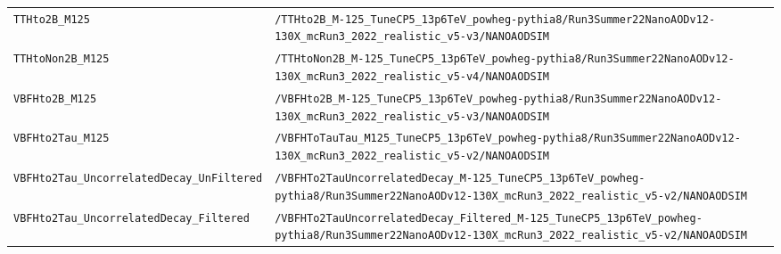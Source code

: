 \begin{longtable}{@{}>{\RaggedRight\arraybackslash}p{} >{\RaggedRight\arraybackslash}p{}@{}}
\addlinespace[2pt]
\texttt{TTHto2B\_\allowbreak{}M125} & \texttt{/\allowbreak{}TTHto2B\_\allowbreak{}M-\allowbreak{}125\_\allowbreak{}TuneCP5\_\allowbreak{}13p6TeV\_\allowbreak{}powheg-\allowbreak{}pythia8/\allowbreak{}Run3Summer22NanoAODv12-\allowbreak{}130X\_\allowbreak{}mcRun3\_\allowbreak{}2022\_\allowbreak{}realistic\_\allowbreak{}v5-\allowbreak{}v3/\allowbreak{}NANOAODSIM} \\
\addlinespace[2pt]
\texttt{TTHtoNon2B\_\allowbreak{}M125} & \texttt{/\allowbreak{}TTHtoNon2B\_\allowbreak{}M-\allowbreak{}125\_\allowbreak{}TuneCP5\_\allowbreak{}13p6TeV\_\allowbreak{}powheg-\allowbreak{}pythia8/\allowbreak{}Run3Summer22NanoAODv12-\allowbreak{}130X\_\allowbreak{}mcRun3\_\allowbreak{}2022\_\allowbreak{}realistic\_\allowbreak{}v5-\allowbreak{}v4/\allowbreak{}NANOAODSIM} \\
\addlinespace[2pt]
\texttt{VBFHto2B\_\allowbreak{}M125} & \texttt{/\allowbreak{}VBFHto2B\_\allowbreak{}M-\allowbreak{}125\_\allowbreak{}TuneCP5\_\allowbreak{}13p6TeV\_\allowbreak{}powheg-\allowbreak{}pythia8/\allowbreak{}Run3Summer22NanoAODv12-\allowbreak{}130X\_\allowbreak{}mcRun3\_\allowbreak{}2022\_\allowbreak{}realistic\_\allowbreak{}v5-\allowbreak{}v3/\allowbreak{}NANOAODSIM} \\
\addlinespace[2pt]
\texttt{VBFHto2Tau\_\allowbreak{}M125} & \texttt{/\allowbreak{}VBFHToTauTau\_\allowbreak{}M125\_\allowbreak{}TuneCP5\_\allowbreak{}13p6TeV\_\allowbreak{}powheg-\allowbreak{}pythia8/\allowbreak{}Run3Summer22NanoAODv12-\allowbreak{}130X\_\allowbreak{}mcRun3\_\allowbreak{}2022\_\allowbreak{}realistic\_\allowbreak{}v5-\allowbreak{}v2/\allowbreak{}NANOAODSIM} \\
\addlinespace[2pt]
\texttt{VBFHto2Tau\_\allowbreak{}UncorrelatedDecay\_\allowbreak{}UnFiltered} & \texttt{/\allowbreak{}VBFHTo2TauUncorrelatedDecay\_\allowbreak{}M-\allowbreak{}125\_\allowbreak{}TuneCP5\_\allowbreak{}13p6TeV\_\allowbreak{}powheg-\allowbreak{}pythia8/\allowbreak{}Run3Summer22NanoAODv12-\allowbreak{}130X\_\allowbreak{}mcRun3\_\allowbreak{}2022\_\allowbreak{}realistic\_\allowbreak{}v5-\allowbreak{}v2/\allowbreak{}NANOAODSIM} \\
\addlinespace[2pt]
\texttt{VBFHto2Tau\_\allowbreak{}UncorrelatedDecay\_\allowbreak{}Filtered} & \texttt{/\allowbreak{}VBFHTo2TauUncorrelatedDecay\_\allowbreak{}Filtered\_\allowbreak{}M-\allowbreak{}125\_\allowbreak{}TuneCP5\_\allowbreak{}13p6TeV\_\allowbreak{}powheg-\allowbreak{}pythia8/\allowbreak{}Run3Summer22NanoAODv12-\allowbreak{}130X\_\allowbreak{}mcRun3\_\allowbreak{}2022\_\allowbreak{}realistic\_\allowbreak{}v5-\allowbreak{}v2/\allowbreak{}NANOAODSIM} \\

\end{longtable}
